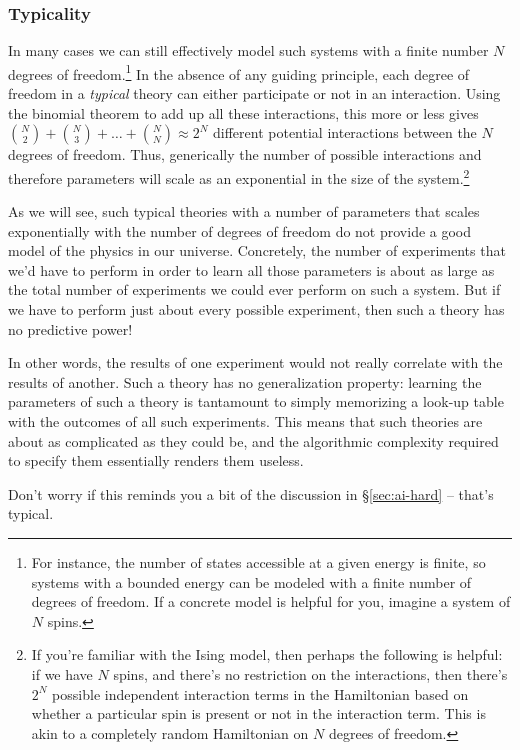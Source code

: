 \documentclass[12pt]{article}
\begin{document}
\subsubsection*{Typicality}


In many cases we can still effectively model such systems with a finite number $N$ degrees of freedom.\footnote{For instance, the number of states accessible at a given energy is finite, so systems with a bounded energy can be modeled with a finite number of degrees of freedom. If a concrete model is helpful for you, imagine a system of $N$ spins.}
In the absence of any guiding principle, each degree of freedom in a \emph{typical} theory can either participate or not in an interaction. Using the binomial theorem to add up all these interactions, this more or less gives $\binom{N}{2} + \binom{N}{3}  + \ldots + \binom{N}{N}\approx 2^N$ different potential interactions between the $N$ degrees of freedom. Thus, generically the number of possible interactions and therefore parameters will scale as an exponential in the size of the system.\footnote{
    If you're familiar with the Ising model, then perhaps the following is helpful: if we have $N$ spins, and there's no restriction on the interactions, then there's $2^N$ possible independent interaction terms in the Hamiltonian based on whether a particular spin is present or not in the interaction term. This is akin to a completely random Hamiltonian on $N$ degrees of freedom.
} %

As we will see, such typical theories with a number of parameters that scales exponentially with the number of degrees of freedom do not provide a good model of the physics in our universe. Concretely, the number of experiments that we'd have to perform in order to learn all those parameters is about as large as the total number of experiments we could ever perform on such a system. But if we have to perform just about every possible experiment, then such a theory has no predictive power! 

In other words, the results of one experiment would not really correlate with the results of another. Such a theory has no generalization property: learning the parameters of such a theory is tantamount to simply memorizing a look-up table with the outcomes of all such experiments.
This means that such theories are about as complicated as they could be, and the algorithmic complexity required to specify them essentially renders them useless. 

Don't worry if this reminds you a bit of the discussion in \S\ref{sec:ai-hard} -- that's typical.
\end{document}
